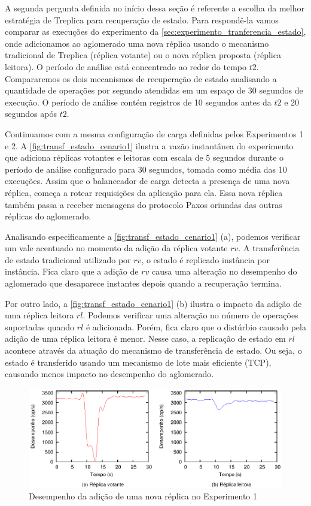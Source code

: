 A segunda pergunta definida no início dessa seção é referente a escolha da melhor
estratégia de Treplica para recuperação de estado. Para respondê-la vamos comparar as
execuções do experimento da \autoref{sec:experimento_tranferencia_estado}, onde
adicionamos ao aglomerado uma nova réplica usando o mecanismo tradicional de Treplica
(réplica votante) ou o nova réplica proposta (réplica leitora). O período de análise está
concentrado ao redor do tempo $t2$. Compararemos os dois mecanismos de recuperação de
estado analisando a quantidade de operações por segundo atendidas em um espaço de 30
segundos de execução. O período de análise contém registros de 10 segundos antes da $t2$ e
20 segundos após $t2$.

Continuamos com a mesma configuração de carga definidas pelos Experimentos 1 e 2. A
\autoref{fig:transf_estado_cenario1} ilustra a vazão instantânea do experimento que
adiciona réplicas votantes e leitoras com escala de 5 segundos durante o período de
análise configurado para 30 segundos, tomada como média das 10 execuções. Assim que o
balanceador de carga detecta a presença de uma nova réplica, começa a rotear requisições
da aplicação para ela. Essa nova réplica também passa a receber mensagens do protocolo
Paxos oriundas das outras réplicas do aglomerado.

Analisando especificamente a \autoref{fig:transf_estado_cenario1} (a), podemos verificar
um vale acentuado no momento da adição da réplica votante $rv$. A transferência de estado
tradicional utilizado por $rv$, o estado é replicado instância por instância. Fica claro
que a adição de $rv$ causa uma alteração no desempenho do aglomerado que desaparece
instantes depois quando a recuperação termina.

Por outro lado, a \autoref{fig:transf_estado_cenario1} (b) ilustra o impacto da adição de
uma réplica leitora $rl$. Podemos verificar uma alteração no número de operações
suportadas quando $rl$ é adicionada. Porém, fica claro que o distúrbio causado pela
adição de uma réplica leitora é menor. Nesse caso, a replicação de estado em $rl$ acontece
através da atuação do mecanismo de transferência de estado. Ou seja, o estado é
transferido usando um mecanismo de lote mais eficiente (TCP), causando menos impacto no
desempenho do aglomerado.

\begin{figure}[ht]
  \centering
  \includegraphics[width=14cm]{conteudo/capitulos/figuras/final-transf-estado-pr50.eps}
  \caption{Desempenho da adição de uma nova réplica no Experimento 1}
  \label{fig:transf_estado_cenario1}
\end{figure}

